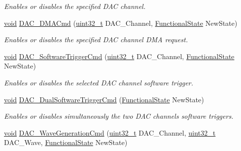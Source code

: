 \begin{DoxyCompactItemize}
\begin{DoxyCompactList}\small\item\em Enables or disables the specified D\+AC channel. \end{DoxyCompactList}\item 
\hyperlink{usb__devapi_8h_afabf60e7f57651d6d595a02c75f07cd0}{void} \hyperlink{group___d_a_c___private___functions_ga194cba38f60ace11658824f0250121f4}{D\+A\+C\+\_\+\+D\+M\+A\+Cmd} (\hyperlink{_p_e___types_8h_a33594304e786b158f3fb30289278f5af}{uint32\+\_\+t} D\+A\+C\+\_\+\+Channel, \hyperlink{agilefox_2library_2inc_2stm32f10x__type_8h_ac9a7e9a35d2513ec15c3b537aaa4fba1}{Functional\+State} New\+State)
\begin{DoxyCompactList}\small\item\em Enables or disables the specified D\+AC channel D\+MA request. \end{DoxyCompactList}\item 
\hyperlink{usb__devapi_8h_afabf60e7f57651d6d595a02c75f07cd0}{void} \hyperlink{group___d_a_c___private___functions_ga46f9f7f6b9520a86e300fe966afe5fb3}{D\+A\+C\+\_\+\+Software\+Trigger\+Cmd} (\hyperlink{_p_e___types_8h_a33594304e786b158f3fb30289278f5af}{uint32\+\_\+t} D\+A\+C\+\_\+\+Channel, \hyperlink{agilefox_2library_2inc_2stm32f10x__type_8h_ac9a7e9a35d2513ec15c3b537aaa4fba1}{Functional\+State} New\+State)
\begin{DoxyCompactList}\small\item\em Enables or disables the selected D\+AC channel software trigger. \end{DoxyCompactList}\item 
\hyperlink{usb__devapi_8h_afabf60e7f57651d6d595a02c75f07cd0}{void} \hyperlink{group___d_a_c___private___functions_gab4d3b364a6b184dcd65f3b294ebf56dc}{D\+A\+C\+\_\+\+Dual\+Software\+Trigger\+Cmd} (\hyperlink{agilefox_2library_2inc_2stm32f10x__type_8h_ac9a7e9a35d2513ec15c3b537aaa4fba1}{Functional\+State} New\+State)
\begin{DoxyCompactList}\small\item\em Enables or disables simultaneously the two D\+AC channels software triggers. \end{DoxyCompactList}\item 
\hyperlink{usb__devapi_8h_afabf60e7f57651d6d595a02c75f07cd0}{void} \hyperlink{group___d_a_c___private___functions_gabd51ae6880821d4dcd923969ec19a19e}{D\+A\+C\+\_\+\+Wave\+Generation\+Cmd} (\hyperlink{_p_e___types_8h_a33594304e786b158f3fb30289278f5af}{uint32\+\_\+t} D\+A\+C\+\_\+\+Channel, \hyperlink{_p_e___types_8h_a33594304e786b158f3fb30289278f5af}{uint32\+\_\+t} D\+A\+C\+\_\+\+Wave, \hyperlink{agilefox_2library_2inc_2stm32f10x__type_8h_ac9a7e9a35d2513ec15c3b537aaa4fba1}{Functional\+State} New\+State)

\end{DoxyCompactItemize}
